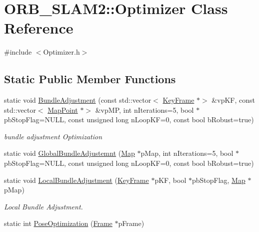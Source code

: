 \hypertarget{class_o_r_b___s_l_a_m2_1_1_optimizer}{}\section{O\+R\+B\+\_\+\+S\+L\+A\+M2\+:\+:Optimizer Class Reference}
\label{class_o_r_b___s_l_a_m2_1_1_optimizer}


{\ttfamily \#include $<$Optimizer.\+h$>$}

\subsection*{Static Public Member Functions}
\begin{DoxyCompactItemize}
\item 
static void \mbox{\hyperlink{class_o_r_b___s_l_a_m2_1_1_optimizer_aac6bf926792ed8a013d64897879a89ec}{Bundle\+Adjustment}} (const std\+::vector$<$ \mbox{\hyperlink{class_o_r_b___s_l_a_m2_1_1_key_frame}{Key\+Frame}} $\ast$$>$ \&vp\+KF, const std\+::vector$<$ \mbox{\hyperlink{class_o_r_b___s_l_a_m2_1_1_map_point}{Map\+Point}} $\ast$$>$ \&vp\+MP, int n\+Iterations=5, bool $\ast$pb\+Stop\+Flag=N\+U\+LL, const unsigned long n\+Loop\+KF=0, const bool b\+Robust=true)
\begin{DoxyCompactList}\small\item\em bundle adjustment Optimization \end{DoxyCompactList}\item 
static void \mbox{\hyperlink{class_o_r_b___s_l_a_m2_1_1_optimizer_aaa9b8a4c16296bf2981b0aaf4ee3189c}{Global\+Bundle\+Adjustemnt}} (\mbox{\hyperlink{class_o_r_b___s_l_a_m2_1_1_map}{Map}} $\ast$p\+Map, int n\+Iterations=5, bool $\ast$pb\+Stop\+Flag=N\+U\+LL, const unsigned long n\+Loop\+KF=0, const bool b\+Robust=true)
\item 
static void \mbox{\hyperlink{class_o_r_b___s_l_a_m2_1_1_optimizer_ab70e0b4f366b65a0c1ae8b2def19d339}{Local\+Bundle\+Adjustment}} (\mbox{\hyperlink{class_o_r_b___s_l_a_m2_1_1_key_frame}{Key\+Frame}} $\ast$p\+KF, bool $\ast$pb\+Stop\+Flag, \mbox{\hyperlink{class_o_r_b___s_l_a_m2_1_1_map}{Map}} $\ast$p\+Map)
\begin{DoxyCompactList}\small\item\em Local Bundle Adjustment. \end{DoxyCompactList}\item 
static int \mbox{\hyperlink{class_o_r_b___s_l_a_m2_1_1_optimizer_a7415d78b8a2323b88e108fa1ea3bf2d3}{Pose\+Optimization}} (\mbox{\hyperlink{class_o_r_b___s_l_a_m2_1_1_frame}{Frame}} $\ast$p\+Frame)

\end{DoxyCompactItemize}

